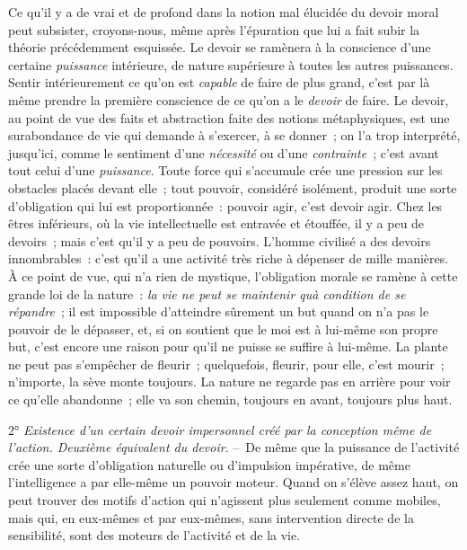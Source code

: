 \documentclass[french,twoside]{book} %
\begin{document}
Ce qu’il y a de vrai et de profond dans la notion mal élucidée du devoir moral peut subsister, croyons-nous, même après l’épuration que lui a fait subir la théorie précédemment esquissée. Le devoir se ramènera à la conscience d’une certaine \emph{puissance} intérieure, de nature supérieure à toutes les autres puissances. Sentir intérieurement ce qu’on est \emph{capable} de faire de plus grand, c’est par là même prendre la première conscience de ce qu’on a le \emph{devoir} de faire. Le devoir, au point de vue des faits et abstraction faite des notions métaphysiques, est une surabondance de vie qui demande à s’exercer, à se donner ; on l’a trop interprété, jusqu’ici, comme le sentiment d’une \emph{nécessité} ou d’une \emph{contrainte} ; c’est avant tout celui d’une \emph{puissance}. Toute force qui s’accumule crée une pression sur les obstacles placés devant elle ; tout pouvoir, considéré isolément, produit une sorte d’obligation qui lui est proportionnée : pouvoir agir, c’est devoir agir. Chez les êtres inférieurs, où la vie intellectuelle est entravée et étouffée, il y a peu de devoirs ; mais c’est qu’il y a peu de pouvoirs. L’homme civilisé a des devoirs innombrables : c’est qu’il a une activité très riche à dépenser de mille manières. À ce point de vue, qui n’a rien de mystique, l’obligation morale se ramène à cette grande loi de la nature : \emph{la vie ne peut se maintenir quà condition de se répandre} ; il est impossible d’atteindre sûrement un but quand on n’a pas le pouvoir de le dépasser, et, si on soutient que le moi est à lui-même son propre but, c’est encore une raison pour qu’il ne puisse se suffire à lui-même. La plante ne peut pas s’empêcher de fleurir ; quelquefois, fleurir, pour elle, c’est mourir ; n’importe, la sève monte toujours. La nature ne regarde pas en arrière pour voir ce qu’elle abandonne ; elle va son chemin, toujours en avant, toujours plus haut.\par
2° \emph{Existence d’un certain devoir impersonnel créé par la conception même de l’action. Deuxième équivalent du devoir}. – De même que la puissance de l’activité crée une sorte d’obligation naturelle ou d’impulsion impérative, de même l’intelligence a par elle-même un pouvoir moteur. Quand on s’élève assez haut, on peut trouver des motifs d’action qui n’agissent plus seulement comme mobiles, mais qui, en eux-mêmes et par eux-mêmes, sans intervention directe de la sensibilité, sont des moteurs de l’activité et de la vie.\par
\end{document}

